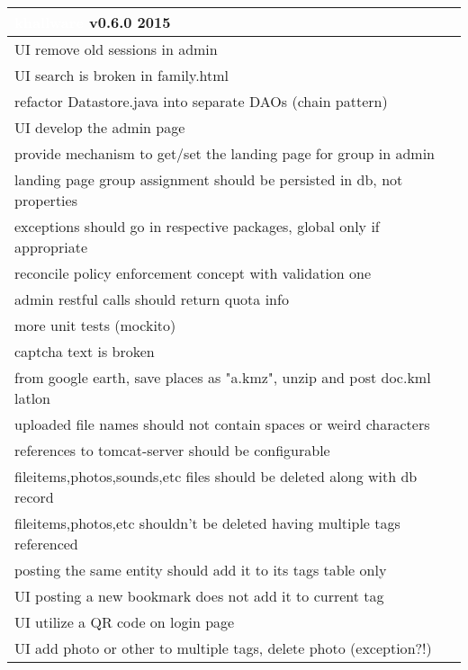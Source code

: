 \documentclass[notitlepage]{article}
\newcommand{\releasedate}{2015}
\begin{document}
\begin{center}
\begin{tabular}{ | l | }
\hline
\LARGE\cellcolor{myblue}\textcolor{white}{khallware} v0.6.0 \releasedate{} \\
\hline
UI remove old sessions in admin \\
\hline
UI search is broken in family.html \\
\hline
refactor Datastore.java into separate DAOs (chain pattern) \\
\hline
UI develop the admin page \\
\hline
provide mechanism to get/set the landing page for group in admin \\
\hline
landing page group assignment should be persisted in db, not properties \\
\hline
exceptions should go in respective packages, global only if appropriate \\
\hline
reconcile policy enforcement concept with validation one \\
\hline
admin restful calls should return quota info \\
\hline
more unit tests (mockito) \\
\hline
captcha text is broken \\
\hline
from google earth, save places as "a.kmz", unzip and post doc.kml latlon \\
\hline
uploaded file names should not contain spaces or weird characters \\
\hline
references to tomcat-server should be configurable \\
\hline
fileitems,photos,sounds,etc files should be deleted along with db record \\
\hline
fileitems,photos,etc shouldn't be deleted having multiple tags referenced \\
\hline
posting the same entity should add it to its tags table only \\
\hline
UI posting a new bookmark does not add it to current tag \\
\hline
UI utilize a QR code on login page \\
\hline
UI add photo or other to multiple tags, delete photo (exception?!) \\
\hline

\end{tabular}
\end{center}
\end{document}
